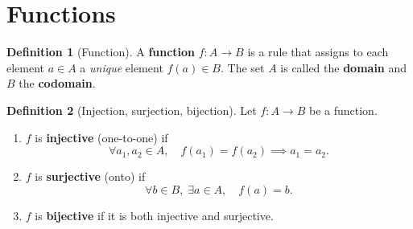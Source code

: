 \documentclass[12pt,a4paper,openany]{book}
\theoremstyle{definition}
\newtheorem{definition}{Definition}[chapter]
\theoremstyle{remark}
\begin{document}
\section{Functions}
\label{sec:functions}

\begin{definition}[Function]\label{def:function}
A \textbf{function} $f : A \to B$ is a rule that assigns to
each element $a \in A$ a \emph{unique} element $f(a) \in B$.  The set $A$
is called the \textbf{domain} and $B$ the
\textbf{codomain}.
\end{definition}

\begin{definition}[Injection, surjection, bijection]\label{def:inj-surj-bij}
Let $f : A \to B$ be a function.
\begin{enumerate}[label=(\roman*)]
  \item $f$ is \textbf{injective} (one-to-one) if
    \[
      \forall a_1, a_2 \in A,\quad f(a_1)=f(a_2) \implies a_1 = a_2.
    \]
  \item $f$ is \textbf{surjective} (onto) if
    \[
      \forall b \in B,\; \exists a \in A,\quad f(a) = b.
    \]
  \item $f$ is \textbf{bijective} if it is both injective
    and surjective.
\end{enumerate}
\end{definition}

\bigskip
\end{document}
